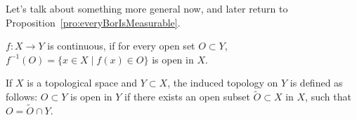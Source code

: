 Let's talk about something more general now, and later return to 
Proposition~\ref{pro:everyBorIsMeasurable}.
\begin{definition}
    $f: X \to Y$ is continuous, if for every open set
    $O \subset Y$, $f^{-1}(O) = \{ x \in X \mid f(x) \in O \}$
    is open in $X$.
\end{definition}
\begin{definition}
    If $X$ is a topological space and $Y \subset X$,
    the induced topology on $Y$ is defined as follows:
    $O \subset Y$ is open in $Y$ if there exists an open subset
    $\tilde{O} \subset X$ in $X$, such that $O = \tilde{O} \cap Y$.
\end{definition}
